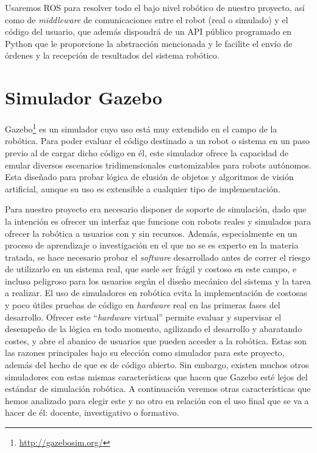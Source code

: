 Usaremos ROS para resolver todo el bajo nivel robótico de nuestro proyecto, así como de \textit{middleware} de comunicaciones entre el robot (real o simulado) y el código del usuario, que además dispondrá de un API público programado en Python que le proporcione la abstracción mencionada y le facilite el envío de órdenes y la recepción de resultados del sistema robótico.

\section{Simulador Gazebo}

Gazebo\footnote{\url{http://gazebosim.org/}} es un simulador cuyo uso está muy extendido en el campo de la robótica. Para poder evaluar el código destinado a un robot o sistema en un paso previo al de cargar dicho código en él, este simulador ofrece la capacidad de emular diversos escenarios tridimensionales customizables para robots autónomos. Esta diseñado para probar lógica de elusión de objetos y algoritmos de visión artificial, aunque su uso es extensible a cualquier tipo de implementación. 

Para nuestro proyecto era necesario disponer de soporte de simulación, dado que la intención es ofrecer un interfaz que funcione con robots reales y simulados para ofrecer la robótica a usuarios con y sin recursos. Además, especialmente en un proceso de aprendizaje o investigación en el que no se es experto en la materia tratada, se hace necesario probar el \textit{software} desarrollado antes de correr el riesgo de utilizarlo en un sistema real, que suele ser frágil y costoso en este campo, e incluso peligroso para los usuarios según el diseño mecánico del sistema y la tarea a realizar. El uso de simuladores en robótica evita la implementación de costosas y poco útiles pruebas de código en \textit{hardware} real en las primeras fases del desarrollo. Ofrecer este ``\textit{hardware} virtual'' permite evaluar y supervisar el desempeño de la lógica en todo momento, agilizando el desarrollo y abaratando costes, y abre el abanico de usuarios que pueden acceder a la robótica. Estas son las razones principales bajo su elección como simulador para este proyecto, además del hecho de que es de código abierto. Sin embargo, existen muchos otros simuladores con estas mismas características que hacen que Gazebo esté lejos del estándar de simulación robótica. A continuación veremos otras características que hemos analizado para elegir este y no otro en relación con el uso final que se va a hacer de él: docente, investigativo o formativo.

